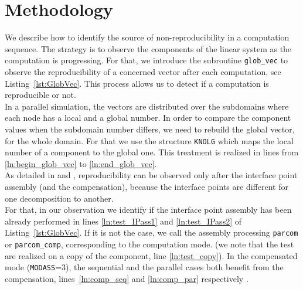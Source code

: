 \section{Methodology}
\label{sec:methodology}
%
We describe how to identify the source of
non-reproducibility in a computation sequence.
The strategy is to observe the components
of the linear system as the computation is progressing.
For that, we introduce the subroutine \texttt{glob\_vec}
to observe the reproducibility of a concerned vector after each computation,
see Listing~\ref{lst:GlobVec}.
This process allows us to detect if a computation is reproducible or not.\\
%
In a parallel simulation, the vectors are distributed over the subdomains where each
node has a local and a global number.
In order to compare the component values when the subdomain number differs,
we need to rebuild the global vector, \ie for the whole domain.
For that we use the structure \texttt{KNOLG} which maps the local number of a component
to the global one.
This treatment is realized in
lines from \ref{ln:begin_glob_vec} to \ref{ln:end_glob_vec}.\\
%
As detailed in \cite{LaND15} and \cite{LaND16}, reproducibility can be observed
only after the interface point assembly (and the compensation), because
the interface points are different for one
decomposition to another.\\
For that, in our observation we identify if the interface point assembly
has been already performed in lines \ref{ln:test_IPass1} and \ref{ln:test_IPass2}
of Listing~\ref{lst:GlobVec}. If it is not the case, we call the assembly processing \texttt{parcom}
or \texttt{parcom\_comp}, corresponding to the computation mode.
(we note that the test are realized on a copy of the component, line \ref{ln:test_copy}).
In the compensated mode (\texttt{MODASS}=3), the sequential and
the parallel cases both benefit from the compensation, lines~\ref{ln:comp_seq} and \ref{ln:comp_par} respectively .

